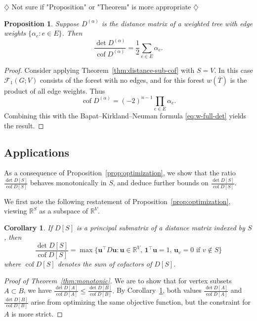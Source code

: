 \documentclass{amsart}
\newtheorem{prop}[thm]{Proposition}
\newtheorem{cor}[thm]{Corollary}
\theoremstyle{definition}
\newcommand{\RR}{\mathbb{R}}
\newcommand{\bone}{\mathbf{1}}
\newcommand{\boldu}{\mathbf{u}}
\newcommand{\Da}{{D^{(\alpha)}}}
\newcommand{\tr}{\intercal}
\DeclareMathOperator{\cof}{cof}
\newcommand{\trees}{\mathcal{F}_1}
\newcommand{\display}{\displaystyle}
\newcommand{\note}[1]{{\color{red} \sf $\diamondsuit$  {#1} $\diamondsuit$ }}
\begin{document}
\note{Not sure if "Proposition" or "Theorem" is more appropriate}
\begin{prop}
\label{prop:full-det-cof-ratio}
Suppose $\Da$ is the distance matrix of a weighted tree with edge weights $\{\alpha_e : e \in E\}$.
Then
\[
	\frac{\det \Da}{\cof \Da} = \frac1{2} \sum_{e \in E} \alpha_e .
\]
\end{prop}
\begin{proof}
Consider applying Theorem~\ref{thm:distance-sub-cof} with $S = V$.
In this case $\trees(G; V)$ consists of the forest with no edges, and for this forest $w(\overline{T})$ is the product of all edge weights.
Thus
\[
	\cof \Da = (-2)^{n - 1} \prod_{e \in E} \alpha_e .
\]
Combining this with the Bapat--Kirkland--Neuman formula \eqref{eq:w-full-det} yields the result.
\end{proof}

\subsection{Applications}

As a consequence of Proposition~\ref{prop:optimization}, we show that the ratio $\displaystyle \frac{\det D[S]}{\cof D[S]}$ behaves monotonically in $S$, and deduce further bounds on $\displaystyle \frac{\det D[S]}{\cof D[S]}$.

We first note the following restatement of Proposition~\ref{prop:optimization}, viewing $\RR^S$ as a subspace of $\RR^V$.
\begin{cor}
\label{cor:optimization}
If $D[S]$ is a principal submatrix of a distance matrix indexed by $S$, then 
\[
	\frac{\det D[S]}{\cof D[S]} = \max \{\boldu^\tr D \boldu : \boldu \in \RR^V,\, \bone^\tr \boldu = 1,\, \boldu_v = 0 \text{ if } v \not\in S \}
\]
where $\cof D[S]$ denotes the sum of cofactors of $D[S]$.
\end{cor}

\begin{proof}[Proof of Theorem~\ref{thm:monotonic}]
We are to show that for vertex subsets $A \subset B$, we have
$\displaystyle 
\frac{\det D[A]}{\cof D[A]} \leq \frac{\det D[B]}{\cof D[B]}.
$
By Corollary~\ref{cor:optimization}, both values $\display \frac{\det D[A]}{\cof D[A]}$ and $\display \frac{\det D[B]}{\cof D[B]}$ arise from optimizing the same objective function, 
but the constraint for $A$ is more strict.
\end{proof}
\end{document}
